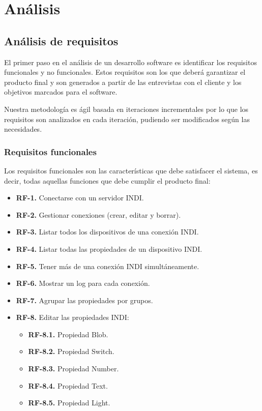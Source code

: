 \chapter{Análisis}

\section{Análisis de requisitos}

El primer paso en el análisis de un desarrollo software es identificar los requisitos funcionales y no funcionales. Estos requisitos son los que deberá garantizar el producto final y son generados a partir de las entrevistas con el cliente y los objetivos marcados para el software.

\bigskip
Nuestra metodología es ágil basada en iteraciones incrementales por lo que los requisitos son analizados en cada iteración, pudiendo ser modificados según las necesidades.


\subsection{Requisitos funcionales}

Los requisitos funcionales son las características que debe satisfacer el sistema, es decir, todas aquellas funciones que debe cumplir el producto final:

\begin{itemize}
	\item \textbf{RF-1.} Conectarse con un servidor INDI.
	\item \textbf{RF-2.} Gestionar conexiones (crear, editar y borrar).
	\item \textbf{RF-3.} Listar todos los dispositivos de una conexión INDI.
	\item \textbf{RF-4.} Listar todas las propiedades de un dispositivo INDI.
	\item \textbf{RF-5.} Tener más de una conexión INDI simultáneamente.
	\item \textbf{RF-6.} Mostrar un log para cada conexión.
	\item \textbf{RF-7.} Agrupar las propiedades por grupos.
	\item \textbf{RF-8.} Editar las propiedades INDI:
		\begin{itemize}
			\item \textbf{RF-8.1.} Propiedad Blob.
			\item \textbf{RF-8.2.} Propiedad Switch.
			\item \textbf{RF-8.3.} Propiedad Number.
			\item \textbf{RF-8.4.} Propiedad Text.
			\item \textbf{RF-8.5.} Propiedad Light.
		\end{itemize}
\end{itemize}

